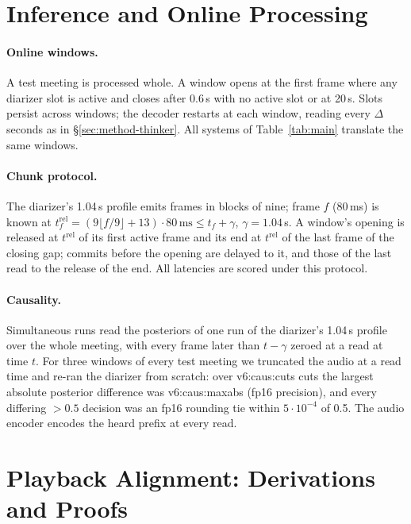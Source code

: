 \section{Inference and Online Processing}
\label{app:online}
\label{app:chunk}
\label{app:causal}

\paragraph{Online windows.} A test meeting is processed whole. A window opens at the first frame where any diarizer
slot is active and closes after 0.6\,s with no active slot or at 20\,s. Slots persist across windows; the decoder
restarts at each window, reading every $\Delta$ seconds as in \S\ref{sec:method-thinker}. All systems of
Table~\ref{tab:main} translate the same windows.

\paragraph{Chunk protocol.} The diarizer's 1.04\,s profile emits frames in blocks of nine; frame $f$ (80\,ms) is known
at $t^{\mathrm{rel}}_f=(9\lfloor f/9\rfloor+13)\cdot 80\,\text{ms}\le t_f+\gamma$, $\gamma=1.04$\,s. A window's opening is
released at $t^{\mathrm{rel}}$ of its first active frame and its end at $t^{\mathrm{rel}}$ of the last frame of the
closing gap; commits before the opening are delayed to it, and those of the last read to the release of the end. All
latencies are scored under this protocol.

\paragraph{Causality.} Simultaneous runs read the posteriors of one run of the diarizer's 1.04\,s profile over the
whole meeting, with every frame later than $t-\gamma$ zeroed at a read at time $t$. For three windows of every test
meeting we truncated the audio at a read time and re-ran the diarizer from scratch: over \num{v6:caus:cuts} cuts the
largest absolute posterior difference was \num{v6:caus:maxabs} (fp16 precision), and every differing $>0.5$ decision
was an fp16 rounding tie within $5\cdot10^{-4}$ of 0.5. The audio encoder encodes the heard prefix at every read.

\section{Playback Alignment: Derivations and Proofs}
\label{app:proofs}

